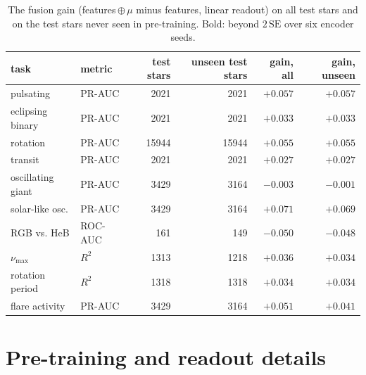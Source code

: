 \documentclass{article}
\begin{document}
\begin{table}[H]
\caption{The fusion gain (features\,$\oplus\,\mu$ minus features, linear readout) on all test stars and
on the test stars never seen in pre-training. Bold: beyond $2\,\mathrm{SE}$ over six encoder seeds.}
\label{tab:unseen}
\centering
\scriptsize
\begin{tabular}{llrrrr}
\toprule
task & metric & test stars & unseen test stars & gain, all & gain, unseen \\
\midrule
pulsating & PR-AUC & 2021 & 2021 & $\boldsymbol{+}\mathbf{0.057}$ & $\boldsymbol{+}\mathbf{0.057}$ \\
eclipsing binary & PR-AUC & 2021 & 2021 & $\boldsymbol{+}\mathbf{0.033}$ & $\boldsymbol{+}\mathbf{0.033}$ \\
rotation & PR-AUC & 15944 & 15944 & $\boldsymbol{+}\mathbf{0.055}$ & $\boldsymbol{+}\mathbf{0.055}$ \\
transit & PR-AUC & 2021 & 2021 & $\boldsymbol{+}\mathbf{0.027}$ & $\boldsymbol{+}\mathbf{0.027}$ \\
oscillating giant & PR-AUC & 3429 & 3164 & $\boldsymbol{-}\mathbf{0.003}$ & ${-}0.001$ \\
solar-like osc. & PR-AUC & 3429 & 3164 & $\boldsymbol{+}\mathbf{0.071}$ & $\boldsymbol{+}\mathbf{0.069}$ \\
RGB vs. HeB & ROC-AUC & 161 & 149 & $\boldsymbol{-}\mathbf{0.050}$ & $\boldsymbol{-}\mathbf{0.048}$ \\
$\nu_{\max}$ & $R^2$ & 1313 & 1218 & $\boldsymbol{+}\mathbf{0.036}$ & $\boldsymbol{+}\mathbf{0.034}$ \\
rotation period & $R^2$ & 1318 & 1318 & $\boldsymbol{+}\mathbf{0.034}$ & $\boldsymbol{+}\mathbf{0.034}$ \\
flare activity & PR-AUC & 3429 & 3164 & $\boldsymbol{+}\mathbf{0.051}$ & $\boldsymbol{+}\mathbf{0.041}$ \\
\bottomrule
\end{tabular}

\end{table}

\section{Pre-training and readout details}
\label{app:training}
\end{document}
